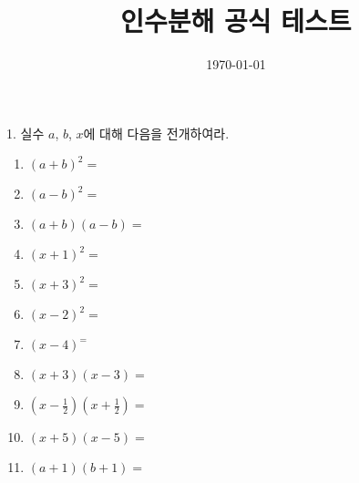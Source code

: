 \documentclass{article}
\begin{document}
\title{인수분해 공식 테스트}
\author{}
\date{\today}
\maketitle


%
1.
실수 \(a\), \(b\), \(x\)에 대해 다음을 전개하여라.
\begin{enumerate}[(1)]
\item
\((a+b)^2=\)
\item
\((a-b)^2=\)
\item
\((a+b)(a-b)=\)
\item
\((x+1)^2=\)
\item
\((x+3)^2=\)
\item
\((x-2)^2=\)
\item
\((x-4)^=\)
\item
\((x+3)(x-3)=\)
\item
\((x-\frac12)(x+\frac12)=\)
\item
\((x+5)(x-5)=\)
\item
\((a+1)(b+1)=\)
\end{enumerate}
\end{document}
